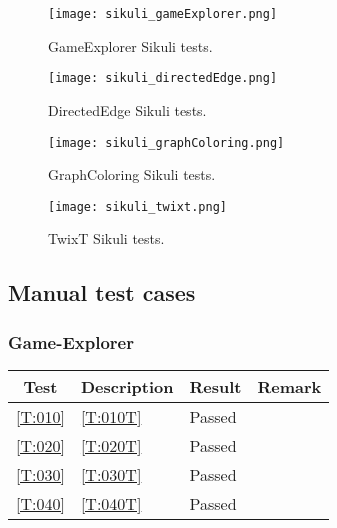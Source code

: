 \begin{figure}[!h]
	\texttt{[image: sikuli\_gameExplorer.png]}
	\caption{GameExplorer Sikuli tests.}
	\label{img:sikuliGameExplorer}
\end{figure}

\begin{figure}[!h]
	\texttt{[image: sikuli\_directedEdge.png]}
	\caption{DirectedEdge Sikuli tests.}
	\label{img:sikuliDirectedEdge}
\end{figure}

\begin{figure}[!h]
	\texttt{[image: sikuli\_graphColoring.png]}
	\caption{GraphColoring Sikuli tests.}
	\label{img:sikuliGraphColoring}
\end{figure}

\begin{figure}[!h]
	\texttt{[image: sikuli\_twixt.png]}
	\caption{TwixT Sikuli tests.}
	\label{img:sikuliTwixt}
\end{figure}

\subsection{Manual test cases}

\subsubsection{Game-Explorer}

\begin{tabular}{clll}
	\hline
	\textbf{Test} & \textbf{Description} & \textbf{Result} & \textbf{Remark} \\
	\hline
	\ref{T:010} & \ref{T:010T} & Passed & \\
	\ref{T:020} & \ref{T:020T} & Passed & \\
	\ref{T:030} & \ref{T:030T} & Passed & \\
	\ref{T:040} & \ref{T:040T} & Passed & \\
	\hline
\end{tabular}

